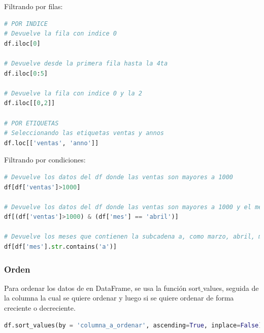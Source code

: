 \documentclass[a4paper, 12pt]{book}
\begin{document}
Filtrando por filas:
\begin{lstlisting}[language=Python]
# POR INDICE
# Devuelve la fila con indice 0
df.iloc[0]
	
# Devuelve desde la primera fila hasta la 4ta
df.iloc[0:5]
	
# Devuelve la fila con indice 0 y la 2
df.iloc[[0,2]]
	
# POR ETIQUETAS
# Seleccionando las etiquetas ventas y annos
df.loc[['ventas', 'anno']]
\end{lstlisting}

Filtrando por condiciones:
\begin{lstlisting}[language=Python]
# Devuelve los datos del df donde las ventas son mayores a 1000
df[df['ventas']>1000]
	
# Devuelve los datos del df donde las ventas son mayores a 1000 y el mes es igual a abril
df[(df['ventas']>1000) & (df['mes'] == 'abril')]
	
# Devuelve los meses que contienen la subcadena a, como marzo, abril, mayo, agosto
df[df['mes'].str.contains('a')]
\end{lstlisting}

\subsubsection{Orden}
Para ordenar los datos de en DataFrame, se usa la función sort$\_$values, seguida de la columna la cual se quiere ordenar y luego si se quiere ordenar de forma creciente o decreciente.
\begin{lstlisting}[language=Python]
df.sort_values(by = 'columna_a_ordenar', ascending=True, inplace=False)
\end{lstlisting}

\end{document}
